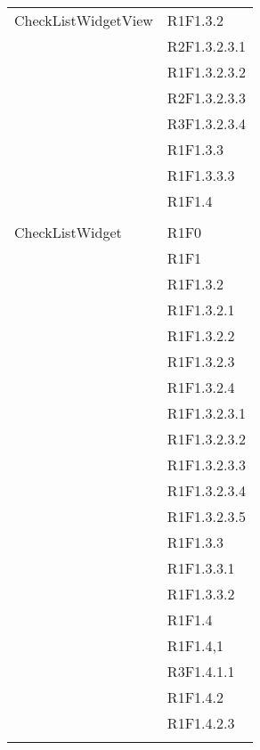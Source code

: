 \begin{center}
\begin{longtable}{|p{7cm}|p{7cm}|}
		CheckListWidgetView & R1F1.3.2 \\ & R2F1.3.2.3.1 \\ & R1F1.3.2.3.2 \\ & R2F1.3.2.3.3 \\ & R3F1.3.2.3.4 \\ & R1F1.3.3 \\ & R1F1.3.3.3 \\ & R1F1.4 \\ & \\ \hline
		CheckListWidget & R1F0 \\ & R1F1 \\ & R1F1.3.2 \\ & R1F1.3.2.1 \\ & R1F1.3.2.2 \\ & R1F1.3.2.3 \\ & R1F1.3.2.4 \\ & R1F1.3.2.3.1 \\ & R1F1.3.2.3.2 \\ & R1F1.3.2.3.3 \\ & R1F1.3.2.3.4 \\ & R1F1.3.2.3.5 \\ & R1F1.3.3 \\ & R1F1.3.3.1 \\ & R1F1.3.3.2 \\ & R1F1.4 \\ & R1F1.4,1 \\ & R3F1.4.1.1 \\ & R1F1.4.2 \\ & R1F1.4.2.3 \\ & \\ \hline

\end{longtable}
\end{center}

